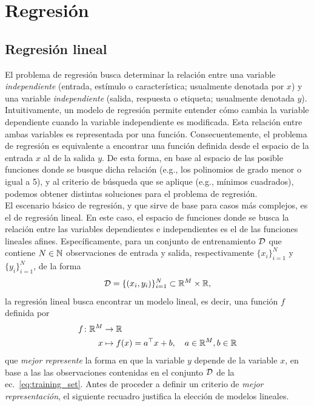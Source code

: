 
\section{Regresión} 

\subsection{Regresión lineal}

El problema de regresión busca determinar la relación entre una variable \emph{independiente} (entrada, estímulo o característica; usualmente denotada por $x$) y una variable \emph{independiente} (salida, respuesta o etiqueta; usualmente denotada $y$). Intuitivamente, un modelo de regresión permite entender cómo cambia la variable dependiente cuando la variable independiente es modificada. Esta relación entre ambas variables es representada por una función. Consecuentemente, el problema de regresión es equivalente a encontrar una función definida desde el espacio de la entrada $x$ al de la salida $y$. De esta forma, en base al espacio de las posible funciones donde se busque dicha relación (e.g., los polinomios de grado menor o igual a 5), y al criterio de búsqueda que se aplique (e.g., mínimos cuadrados), podemos obtener distintas soluciones para el problema de regresión.\\

El escenario básico de regresión, y que sirve de base para casos más complejos, es el de regresión lineal. En este caso, el espacio de funciones donde se busca la relación entre las variables dependientes e independientes es el de las funciones lineales afines. Específicamente, para un conjunto de entrenamiento ${\mathcal D}$ que contiene $N\in{\mathbb N}$ observaciones de entrada y salida, respectivamente $\{x_i\}_{i=1}^N$ y $\{y_i\}_{i=1}^N$, de la forma
\begin{equation}
	{\mathcal D}=\{(x_i,y_i)\}_{i=1}^N\subset \mathbb{R}^M \times \mathbb{R},
	\label{eq:training_set}
\end{equation}
la regresión lineal busca encontrar un modelo lineal, es decir, una función $f$ definida por 
\begin{align}
  f \colon \mathbb{R}^M &\to \mathbb{R}\nonumber\\
  x &\mapsto f(x)=a^\top x + b,\quad a\in\mathbb{R}^M,b\in\mathbb{R}
   \label{eq:reg_lin_fn} 
\end{align}
que \emph{mejor represente} la forma en que la variable $y$ depende de la variable $x$, en base a las las observaciones contenidas en el conjunto ${\mathcal D}$ de la ec.~\eqref{eq:training_set}. Antes de proceder a definir un criterio de \emph{mejor representación}, el siguiente recuadro justifica la elección de modelos lineales. 

